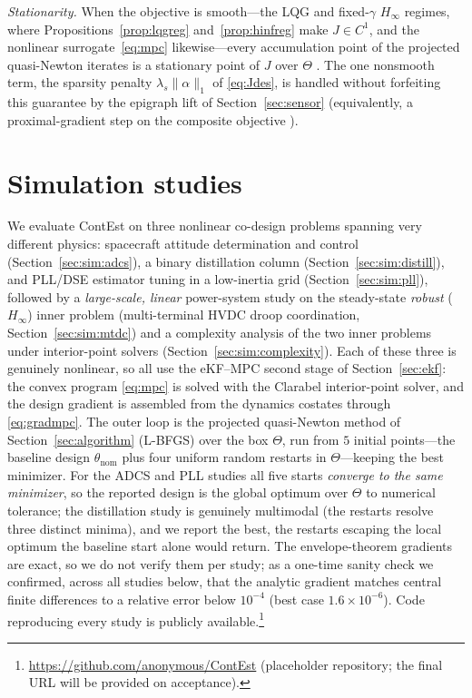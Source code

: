 \documentclass[twocolumn,amsthm]{autart}
\begin{document}
\emph{Stationarity.} When the objective is smooth---the LQG and fixed-$\gamma$
$H_\infty$ regimes, where Propositions~\ref{prop:lqgreg} and~\ref{prop:hinfreg}
make $J\in C^1$, and the nonlinear surrogate~\eqref{eq:mpc} likewise---every
accumulation point of the projected quasi-Newton iterates is a stationary point of
$J$ over $\Theta$ \cite{beck2017first}. The one nonsmooth term, the sparsity
penalty $\lambda_s\|\alpha\|_1$ of \eqref{eq:Jdes}, is handled without forfeiting
this guarantee by the epigraph lift of Section~\ref{sec:sensor} (equivalently, a
proximal-gradient step on the composite objective \cite{beck2017first}).

\section{Simulation studies}\label{sec:numerical}

We evaluate ContEst on three nonlinear co-design problems spanning very different
physics: spacecraft attitude determination and control (Section~\ref{sec:sim:adcs}), a
binary distillation column (Section~\ref{sec:sim:distill}), and PLL/DSE estimator
tuning in a low-inertia grid (Section~\ref{sec:sim:pll}), followed by a
\emph{large-scale, linear} power-system study on the steady-state \emph{robust}
($H_\infty$) inner problem (multi-terminal HVDC droop coordination,
Section~\ref{sec:sim:mtdc}) and a complexity analysis of the two inner
problems under interior-point solvers (Section~\ref{sec:sim:complexity}). Each of
these three is genuinely nonlinear, so all
use the eKF--MPC second stage of Section~\ref{sec:ekf}: the convex program
\eqref{eq:mpc} is solved with the Clarabel interior-point solver, and the design
gradient is assembled from the dynamics costates through \eqref{eq:gradmpc}.
The outer loop is the projected quasi-Newton method of
Section~\ref{sec:algorithm} (L-BFGS) over the box $\Theta$, run from $5$ initial
points---the baseline design $\theta_{\mathrm{nom}}$ plus four uniform random
restarts in $\Theta$---keeping the best minimizer. For the ADCS and PLL
studies all five starts \emph{converge to the same minimizer}, so the reported
design is the global optimum over $\Theta$ to numerical tolerance; the distillation
study is genuinely multimodal (the restarts resolve three distinct minima), and we
report the best, the restarts escaping the local optimum the baseline start alone
would return. The envelope-theorem gradients are exact, so we do not verify them
per study; as a one-time sanity check we confirmed, across all studies below, that
the analytic gradient matches central finite differences to a relative error below
$10^{-4}$ (best case $1.6\times10^{-6}$). Code reproducing every study is publicly
available.\footnote{\url{https://github.com/anonymous/ContEst} (placeholder
repository; the final URL will be provided on acceptance).}
\end{document}
